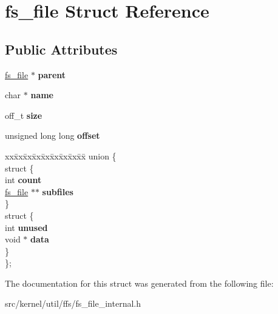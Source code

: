 \hypertarget{structfs__file}{}\section{fs\+\_\+file Struct Reference}
\label{structfs__file}
\subsection*{Public Attributes}
\begin{DoxyCompactItemize}
\item 
\mbox{\label{structfs__file_a2e04d6a2141ddacf4718b0a7c3d4ad09}} 
\hyperlink{structfs__file}{fs\+\_\+file} $\ast$ {\bfseries parent}
\item 
\mbox{\label{structfs__file_a03b7719fac299a4fd5a4daf2676fea9a}} 
char $\ast$ {\bfseries name}
\item 
\mbox{\label{structfs__file_a8285a74af201be48f21fb5bcfdbe83a9}} 
off\+\_\+t {\bfseries size}
\item 
\mbox{\label{structfs__file_ad5b94ea01c4298880866e21831083ab9}} 
unsigned long long {\bfseries offset}
\item 
\mbox{\label{structfs__file_adf62ece181cb1d23586cd20ec1d2d5e7}} 
\begin{tabbing}
xx\=xx\=xx\=xx\=xx\=xx\=xx\=xx\=xx\=\kill
union \{\\
\mbox{\label{unionfs__file_1_1_0D3_a7fdf402cb36e3f6243a6f71112e3ddce}} 
\>struct \{\\
\>\>int {\bfseries count}\\
\>\>\hyperlink{structfs__file}{fs\_file} $\ast$$\ast$ {\bfseries subfiles}\\
\>\} \\
\mbox{\label{unionfs__file_1_1_0D3_a1dde4f4e79365ae0d152652ba278453e}} 
\>struct \{\\
\>\>int {\bfseries unused}\\
\>\>void $\ast$ {\bfseries data}\\
\>\} \\
\}; \\

\end{tabbing}\end{DoxyCompactItemize}


The documentation for this struct was generated from the following file\+:\begin{DoxyCompactItemize}
\item 
src/kernel/util/ffs/fs\+\_\+file\+\_\+internal.\+h\end{DoxyCompactItemize}
